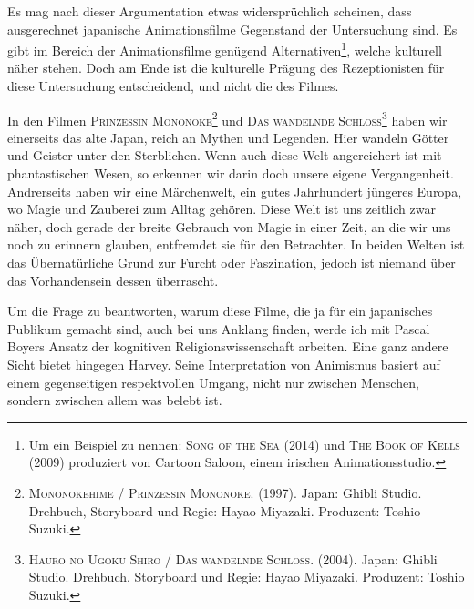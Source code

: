 Es mag nach dieser Argumentation etwas widersprüchlich scheinen, dass ausgerechnet japanische Animationsfilme Gegenstand der Untersuchung sind. Es gibt im Bereich der Animationsfilme genügend Alternativen\footnote{Um ein Beispiel zu nennen: \textsc{Song of the Sea} (2014) und \textsc{The Book of Kells} (2009) produziert von Cartoon Saloon, einem irischen Animationsstudio.}, welche kulturell näher stehen. Doch am Ende ist die kulturelle Prägung des Rezeptionisten für diese Untersuchung entscheidend, und nicht die des Filmes. 

In den Filmen \textsc{Prinzessin Mononoke}\footnote{\textsc{Mononokehime / Prinzessin Mononoke}. (1997). Japan: Ghibli Studio. Drehbuch, Storyboard und Regie: Hayao Miyazaki. Produzent: Toshio Suzuki.} und \textsc{Das wandelnde Schloss}\footnote{\textsc{Hauro no Ugoku Shiro / Das wandelnde Schloss}. (2004). Japan: Ghibli Studio. Drehbuch, Storyboard und Regie: Hayao Miyazaki. Produzent: Toshio Suzuki.} haben wir einerseits das alte Japan, reich an Mythen und Legenden. Hier wandeln Götter und Geister unter den Sterblichen. Wenn auch diese Welt angereichert ist mit phantastischen Wesen, so erkennen wir darin doch unsere eigene Vergangenheit. Andrerseits haben wir eine Märchenwelt, ein gutes Jahrhundert jüngeres Europa, wo Magie und Zauberei zum Alltag gehören. Diese Welt ist uns zeitlich zwar näher, doch gerade der breite Gebrauch von Magie in einer Zeit, an die wir uns noch zu erinnern glauben, entfremdet sie für den Betrachter. In beiden Welten ist das Übernatürliche Grund zur Furcht oder Faszination, jedoch ist niemand über das Vorhandensein dessen überrascht.

Um die Frage zu beantworten, warum diese Filme, die ja für ein japanisches Publikum gemacht sind, auch bei uns Anklang finden, werde ich mit Pascal Boyers Ansatz der kognitiven Religionswissenschaft arbeiten. Eine ganz andere Sicht bietet hingegen Harvey. Seine Interpretation von Animismus basiert auf einem gegenseitigen respektvollen Umgang, nicht nur zwischen Menschen, sondern zwischen allem was belebt ist.

